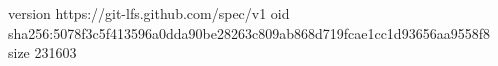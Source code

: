 version https://git-lfs.github.com/spec/v1
oid sha256:5078f3c5f413596a0dda90be28263c809ab868d719fcae1cc1d93656aa9558f8
size 231603
